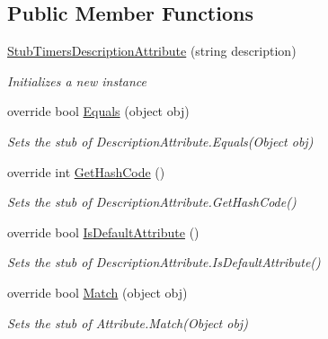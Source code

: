 \subsection*{Public Member Functions}
\begin{DoxyCompactItemize}
\item 
\hyperlink{class_system_1_1_timers_1_1_fakes_1_1_stub_timers_description_attribute_aca96f35af39f3d1551e259049a5520fd}{Stub\-Timers\-Description\-Attribute} (string description)
\begin{DoxyCompactList}\small\item\em Initializes a new instance\end{DoxyCompactList}\item 
override bool \hyperlink{class_system_1_1_timers_1_1_fakes_1_1_stub_timers_description_attribute_a985ffd4a8b42e9169b7aa4ba56082879}{Equals} (object obj)
\begin{DoxyCompactList}\small\item\em Sets the stub of Description\-Attribute.\-Equals(\-Object obj)\end{DoxyCompactList}\item 
override int \hyperlink{class_system_1_1_timers_1_1_fakes_1_1_stub_timers_description_attribute_a60b7e9db308ea082b0b77d17242b1b7d}{Get\-Hash\-Code} ()
\begin{DoxyCompactList}\small\item\em Sets the stub of Description\-Attribute.\-Get\-Hash\-Code()\end{DoxyCompactList}\item 
override bool \hyperlink{class_system_1_1_timers_1_1_fakes_1_1_stub_timers_description_attribute_ae96654735b66ad9daf5291bd02441be5}{Is\-Default\-Attribute} ()
\begin{DoxyCompactList}\small\item\em Sets the stub of Description\-Attribute.\-Is\-Default\-Attribute()\end{DoxyCompactList}\item 
override bool \hyperlink{class_system_1_1_timers_1_1_fakes_1_1_stub_timers_description_attribute_ad96386bf2f3b3d88c57164744dd8574f}{Match} (object obj)
\begin{DoxyCompactList}\small\item\em Sets the stub of Attribute.\-Match(\-Object obj)\end{DoxyCompactList}\end{DoxyCompactItemize}
